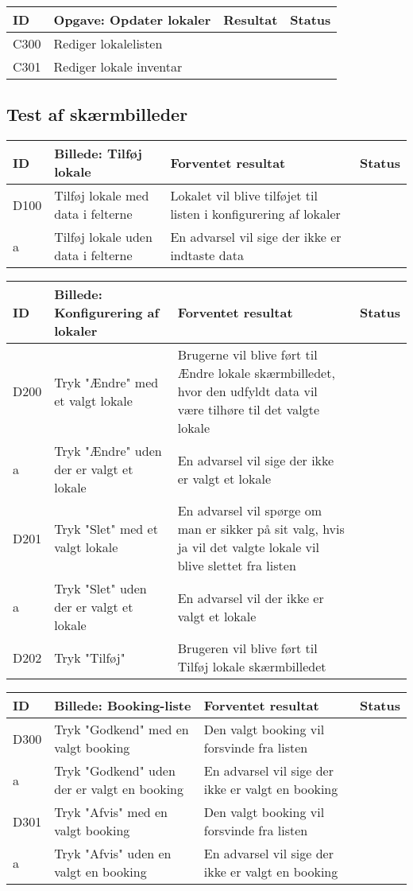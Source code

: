 \begin{tabularx}{\textwidth}{ |X|X|X|X| }
\hline
	ID & Opgave: Opdater lokaler & Resultat & Status\\ 
\hline
	C300 & Rediger lokalelisten & & \\
\hline
	C301 & Rediger lokale inventar & & \\
\hline
\end{tabularx}


\subsection{Test af skærmbilleder}
 \label{App_Test_ListOfTest_ScreenTests}

\begin{tabularx}{\textwidth}{ |X|X|X|X| }
\hline
	ID & Billede: Tilføj lokale  & Forventet resultat & Status\\ 
\hline
	D100 &Tilføj lokale med data i felterne & Lokalet vil blive tilføjet til listen i konfigurering af lokaler & \\
\hline
	a & Tilføj lokale uden data i felterne  & En advarsel vil sige der ikke er indtaste data & \\
\hline
\end{tabularx}

\begin{tabularx}{\textwidth}{ |X|X|X|X| }
\hline
	ID & Billede: Konfigurering af lokaler & Forventet resultat & Status\\ 
\hline
	D200 & Tryk "Ændre" med et valgt lokale & Brugerne vil blive ført til Ændre lokale skærmbilledet, hvor den udfyldt data vil være tilhøre til det valgte lokale & \\
\hline
	a & Tryk "Ændre" uden der er valgt et lokale & En advarsel vil sige der ikke er valgt et lokale & \\
\hline
	D201 & Tryk "Slet" med et valgt lokale &En advarsel vil spørge om man er sikker på sit valg, hvis ja vil det valgte lokale vil blive slettet fra listen & \\
\hline
	a & Tryk "Slet" uden der er valgt et lokale & En advarsel vil der ikke er valgt et lokale & \\
\hline
	D202 & Tryk "Tilføj" & Brugeren vil blive ført til Tilføj lokale skærmbilledet & \\
\hline
\end{tabularx}

\begin{tabularx}{\textwidth}{ |X|X|X|X| }
\hline
	ID & Billede: Booking-liste  & Forventet resultat & Status\\ 
\hline
	D300 & Tryk "Godkend" med en valgt booking & Den valgt booking vil forsvinde fra listen & \\
\hline
	a & Tryk "Godkend" uden der er valgt en booking & En advarsel vil sige der ikke er valgt en booking & \\
\hline
	D301 & Tryk "Afvis" med en valgt booking & Den valgt booking vil forsvinde fra listen & \\
\hline
	a & Tryk "Afvis" uden en valgt en booking & En advarsel vil sige der ikke er valgt en booking & \\
\hline
\end{tabularx}

